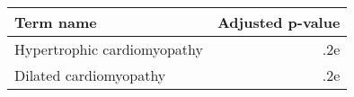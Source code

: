 \begin{tabular}{lr}
\toprule
                  Term name &  Adjusted p-value \\
\midrule
Hypertrophic cardiomyopathy &               .2e \\
     Dilated cardiomyopathy &               .2e \\
\bottomrule
\end{tabular}
